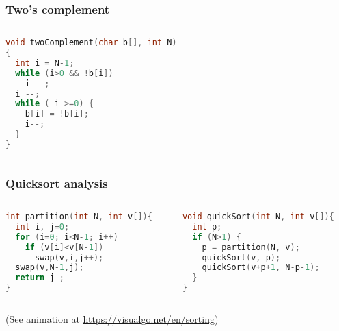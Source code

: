 \documentclass[aspectratio=169]{beamer}
\begin{document}
\begin{frame}[fragile]\frametitle{Two's complement}
\begin{columns}
\begin{column}{0.48\textwidth}
\begin{lstlisting}[language=C++,emph={twoComplement}]
void twoComplement(char b[], int N)
{
  int i = N-1;
  while (i>0 && !b[i])
    i --;
  i --;
  while ( i >=0) {
    b[i] = !b[i];
    i--;
  }
}
\end{lstlisting}
\end{column}
\begin{column}{0.48\textwidth}
\end{column}
\end{columns}
\end{frame}




\begin{frame}[fragile]\frametitle{Quicksort analysis}
    
\begin{columns}
\begin{column}{0.48\textwidth}
\begin{lstlisting}[language=C++,emph={partition,quickSort,swap}]
int partition(int N, int v[]){
  int i, j=0;
  for (i=0; i<N-1; i++)
    if (v[i]<v[N-1])
      swap(v,i,j++);
  swap(v,N-1,j);
  return j ;
}
\end{lstlisting}
\end{column}
\begin{column}{0.48\textwidth}
\begin{lstlisting}[language=C++,emph={partition,quickSort}]
void quickSort(int N, int v[]){
  int p;
  if (N>1) {
    p = partition(N, v);
    quickSort(v, p);
    quickSort(v+p+1, N-p-1);
  }
}
\end{lstlisting}
\end{column}
\end{columns}

(See animation at \url{https://visualgo.net/en/sorting})

\end{frame}
\end{document}
